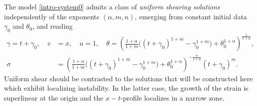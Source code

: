 \documentclass[a4paper,11pt]{article}
\def\blue{\color{blue}}
\theoremstyle{remark}
\begin{document}
The model \eqref{intro-system0} admits {\blue a class } of {\it uniform shearing solutions} independently of the exponents $(\alpha,m,n)$, emerging from constant initial
data $\gamma_0$ and $\theta_0$, and  reading
\begin{equation} \label{intro:uss}
 \begin{aligned}
 \gamma = t+\gamma_0, \quad v&=x, \quad u=1, \quad \theta = \left( \frac{1+\alpha}{1+m} \big( (t+\gamma_0)^{1+m}-\gamma_0^{1+m}\big) + \theta_0^{1+\alpha}\right)^{\frac{1}{1+\alpha}}, \\
 \sigma&=\left( \frac{1+\alpha}{1+m} \big( (t+\gamma_0)^{1+m}-\gamma_0^{1+m}\big) + \theta_0^{1+\alpha} \right)^{-\frac{\alpha}{1+\alpha}}(t+\gamma_0)^m.
 \end{aligned}
\end{equation}
Uniform shear should be contrasted to the solutions that will be constructed here which exhibit localizing instability.
 In the latter case, the growth of the strain is superlinear at {\blue the origin} and the $x-t$-profile localizes in a narrow zone.%
\end{document}
